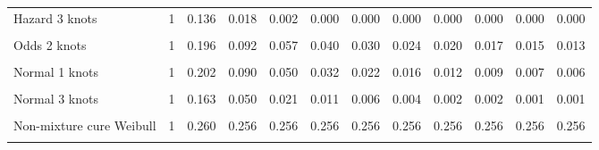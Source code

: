 \documentclass[
]{article}
\begin{document}
\begin{table}[H]
{\begin{tabular}[t]{lrrrrrrrrrrr}
Hazard 3 knots & 1 & 0.136 & 0.018 & 0.002 & 0.000 & 0.000 & 0.000 & 0.000 & 0.000 & 0.000 & 0.000\\
\cellcolor{gray!10}{Odds 1 knots} & \cellcolor{gray!10}{1} & \cellcolor{gray!10}{0.223} & \cellcolor{gray!10}{0.121} & \cellcolor{gray!10}{0.083} & \cellcolor{gray!10}{0.062} & \cellcolor{gray!10}{0.050} & \cellcolor{gray!10}{0.042} & \cellcolor{gray!10}{0.036} & \cellcolor{gray!10}{0.031} & \cellcolor{gray!10}{0.028} & \cellcolor{gray!10}{0.025}\\
Odds 2 knots & 1 & 0.196 & 0.092 & 0.057 & 0.040 & 0.030 & 0.024 & 0.020 & 0.017 & 0.015 & 0.013\\
\cellcolor{gray!10}{Odds 3 knots} & \cellcolor{gray!10}{1} & \cellcolor{gray!10}{0.172} & \cellcolor{gray!10}{0.067} & \cellcolor{gray!10}{0.038} & \cellcolor{gray!10}{0.025} & \cellcolor{gray!10}{0.018} & \cellcolor{gray!10}{0.013} & \cellcolor{gray!10}{0.011} & \cellcolor{gray!10}{0.009} & \cellcolor{gray!10}{0.007} & \cellcolor{gray!10}{0.006}\\
Normal 1 knots & 1 & 0.202 & 0.090 & 0.050 & 0.032 & 0.022 & 0.016 & 0.012 & 0.009 & 0.007 & 0.006\\
\cellcolor{gray!10}{Normal 2 knots} & \cellcolor{gray!10}{1} & \cellcolor{gray!10}{0.193} & \cellcolor{gray!10}{0.081} & \cellcolor{gray!10}{0.043} & \cellcolor{gray!10}{0.026} & \cellcolor{gray!10}{0.017} & \cellcolor{gray!10}{0.012} & \cellcolor{gray!10}{0.009} & \cellcolor{gray!10}{0.007} & \cellcolor{gray!10}{0.005} & \cellcolor{gray!10}{0.004}\\
Normal 3 knots & 1 & 0.163 & 0.050 & 0.021 & 0.011 & 0.006 & 0.004 & 0.002 & 0.002 & 0.001 & 0.001\\
\cellcolor{gray!10}{Mixture cure Weibull} & \cellcolor{gray!10}{1} & \cellcolor{gray!10}{0.268} & \cellcolor{gray!10}{0.266} & \cellcolor{gray!10}{0.266} & \cellcolor{gray!10}{0.266} & \cellcolor{gray!10}{0.266} & \cellcolor{gray!10}{0.266} & \cellcolor{gray!10}{0.266} & \cellcolor{gray!10}{0.266} & \cellcolor{gray!10}{0.266} & \cellcolor{gray!10}{0.266}\\
Non-mixture cure Weibull & 1 & 0.260 & 0.256 & 0.256 & 0.256 & 0.256 & 0.256 & 0.256 & 0.256 & 0.256 & 0.256\\
\cellcolor{gray!10}{Mixture cure Log-normal} & \cellcolor{gray!10}{1} & \cellcolor{gray!10}{0.231} & \cellcolor{gray!10}{0.188} & \cellcolor{gray!10}{0.182} & \cellcolor{gray!10}{0.180} & \cellcolor{gray!10}{0.180} & \cellcolor{gray!10}{0.179} & \cellcolor{gray!10}{0.179} & \cellcolor{gray!10}{0.179} & \cellcolor{gray!10}{0.179} & \cellcolor{gray!10}{0.179}\\

\end{tabular}}
\end{table}
\end{document}

